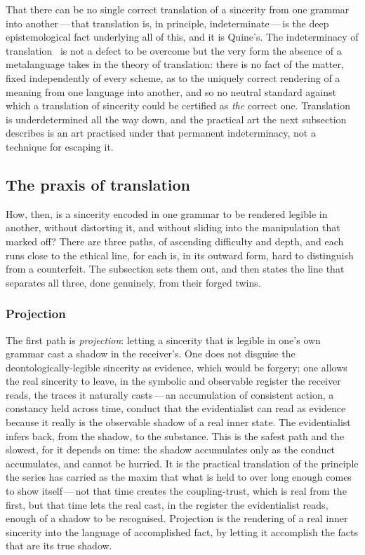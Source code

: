 That there can be no single correct translation of a sincerity from one grammar into another\,---\,that translation is, in principle, indeterminate\,---\,is the deep epistemological fact underlying all of this, and it is Quine's. The indeterminacy of translation~\parencite{quine1960} is not a defect to be overcome but the very form the absence of a metalanguage takes in the theory of translation: there is no fact of the matter, fixed independently of every scheme, as to the uniquely correct rendering of a meaning from one language into another, and so no neutral standard against which a translation of sincerity could be certified as \emph{the} correct one. Translation is underdetermined all the way down, and the practical art the next subsection describes is an art practised under that permanent indeterminacy, not a technique for escaping it.

\subsection{The praxis of translation}
\label{p13:sub:trans-praxis}

How, then, is a sincerity encoded in one grammar to be rendered legible in another, without distorting it, and without sliding into the manipulation that  marked off? There are three paths, of ascending difficulty and depth, and each runs close to the ethical line, for each is, in its outward form, hard to distinguish from a counterfeit. The subsection sets them out, and then states the line that separates all three, done genuinely, from their forged twins.

\subsubsection{Projection}
\label{p13:sub:trans-projection}

The first path is \emph{projection}: letting a sincerity that is legible in one's own grammar cast a shadow in the receiver's. One does not disguise the deontologically-legible sincerity as evidence, which would be forgery; one allows the real sincerity to leave, in the symbolic and observable register the receiver reads, the traces it naturally casts\,---\,an accumulation of consistent action, a constancy held across time, conduct that the evidentialist can read as evidence because it really is the observable shadow of a real inner state. The evidentialist infers back, from the shadow, to the substance. This is the safest path and the slowest, for it depends on time: the shadow accumulates only as the conduct accumulates, and cannot be hurried. It is the practical translation of the principle the series has carried as the maxim that what is held to over long enough comes to show itself\,---\,not that time creates the coupling-trust, which is real from the first, but that time lets the real cast, in the register the evidentialist reads, enough of a shadow to be recognised. Projection is the rendering of a real inner sincerity into the language of accomplished fact, by letting it accomplish the facts that are its true shadow.

